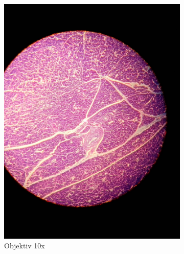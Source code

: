 \begin{figure}[h!]
	\centering
	\begin{subfigure}[b]{0.3\textwidth}
		\includegraphics[width=1\textwidth]{../images/01_pankreas.jpg}
		\caption{Objektiv 10x}
		\label{fig:01_pankreas}
	\end{subfigure}
	\begin{subfigure}[b]{0.3\textwidth}

\end{subfigure}
\end{figure}
